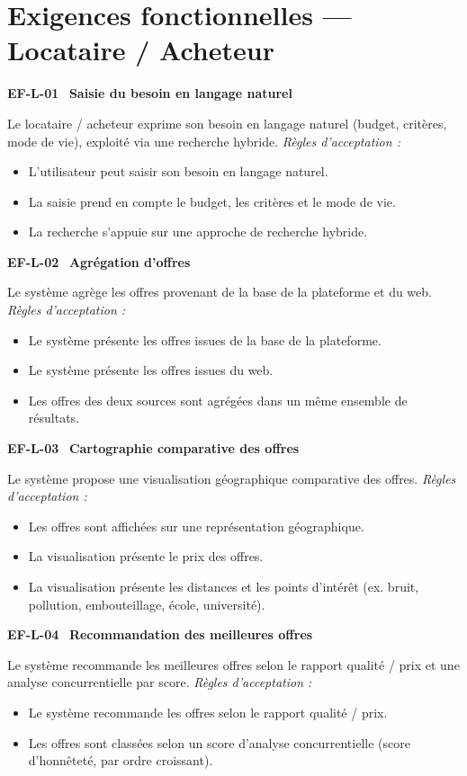 \documentclass[11pt,a4paper]{article}
\newcommand{\exigence}[2]{%
  \par\vspace{6pt}%
  \noindent\colorbox{light}{%
    \parbox{\dimexpr\textwidth-2\fboxsep}{%
      \textbf{\color{primary}#1} \textemdash\ \textbf{#2}%
    }%
  }\par\vspace{2pt}%
}
\newenvironment{acceptation}
  {\vspace{2pt}\noindent\textit{Règles d'acceptation :}
   \begin{itemize}[leftmargin=1.4em,itemsep=1pt,topsep=2pt]}
  {\end{itemize}\vspace{4pt}}
\begin{document}
\clearpage

\section{Exigences fonctionnelles — Locataire / Acheteur}

\exigence{EF-L-01}{Saisie du besoin en langage naturel}
Le locataire / acheteur exprime son besoin en langage naturel (budget,
critères, mode de vie), exploité via une recherche hybride.
\begin{acceptation}
  \item L'utilisateur peut saisir son besoin en langage naturel.
  \item La saisie prend en compte le budget, les critères et le mode de vie.
  \item La recherche s'appuie sur une approche de recherche hybride.
\end{acceptation}

\exigence{EF-L-02}{Agrégation d'offres}
Le système agrège les offres provenant de la base de la plateforme et du web.
\begin{acceptation}
  \item Le système présente les offres issues de la base de la plateforme.
  \item Le système présente les offres issues du web.
  \item Les offres des deux sources sont agrégées dans un même ensemble de résultats.
\end{acceptation}

\exigence{EF-L-03}{Cartographie comparative des offres}
Le système propose une visualisation géographique comparative des offres.
\begin{acceptation}
  \item Les offres sont affichées sur une représentation géographique.
  \item La visualisation présente le prix des offres.
  \item La visualisation présente les distances et les points d'intérêt (ex. bruit, pollution, embouteillage, école, université).
\end{acceptation}

\exigence{EF-L-04}{Recommandation des meilleures offres}
Le système recommande les meilleures offres selon le rapport qualité / prix
et une analyse concurrentielle par score.
\begin{acceptation}
  \item Le système recommande les offres selon le rapport qualité / prix.
  \item Les offres sont classées selon un score d'analyse concurrentielle (score d'honnêteté, par ordre croissant).
\end{acceptation}
\end{document}
